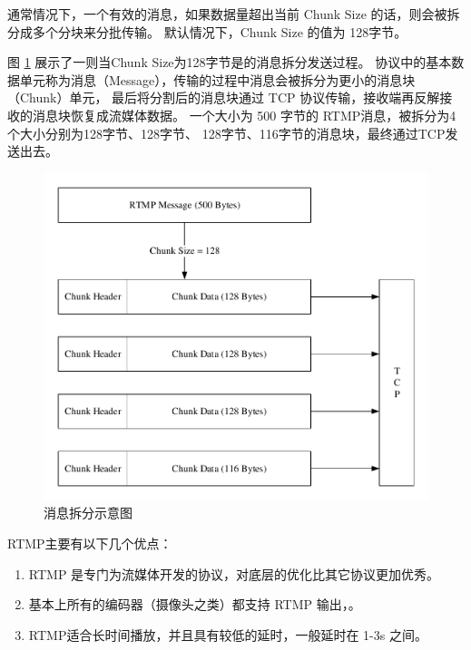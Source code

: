 通常情况下，一个有效的消息，如果数据量超出当前 Chunk Size 的话，则会被拆分成多个分块来分批传输。
默认情况下，Chunk Size 的值为 128字节。

图 \ref{Fig:rtmp} 展示了一则当Chunk Size为128字节是的消息拆分发送过程。
协议中的基本数据单元称为消息（Message），传输的过程中消息会被拆分为更小的消息块（Chunk）单元，
最后将分割后的消息块通过 TCP 协议传输，接收端再反解接收的消息块恢复成流媒体数据。
一个大小为 500 字节的 RTMP消息，被拆分为4个大小分别为128字节、128字节、
128字节、116字节的消息块，最终通过TCP发送出去。

\begin{figure}[ht]
    \centering
    \includegraphics[scale=.8]{./Figure/IMG_rtmp.pdf}
    \caption{消息拆分示意图}
    \label{Fig:rtmp}
\end{figure}

\newpage
RTMP主要有以下几个优点：
\begin{enumerate}
    \item RTMP 是专门为流媒体开发的协议，对底层的优化比其它协议更加优秀。
    \item 基本上所有的编码器（摄像头之类）都支持 RTMP 输出，。
    \item RTMP适合长时间播放，并且具有较低的延时，一般延时在 1-3s 之间。
\end{enumerate}

